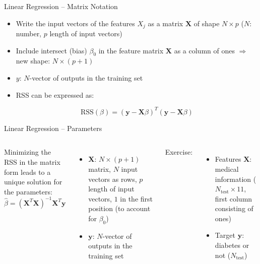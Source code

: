 \documentclass[
                en,
                ]{sdqbeamer}
\begin{document}
\begin{frame}{Linear Regression -- Matrix Notation}
    \begin{itemize}
        \setlength\itemsep{2em}
        \item Write the input vectors of the features $X_j$ as a matrix
            $\boldsymbol{X}$ of shape $N \times p$ ($N$: number, $p$ length of
            input vectors)
        \item Include intersect (bias) $\beta_0$ in the feature matrix
            $\boldsymbol{X}$ as a column of ones $\Rightarrow$ new shape: $N
            \times (p+1)$
        \item $y$: $N$-vector of outputs in the training set
        \item RSS can be expressed as:

            \begin{equation*}
                \text{RSS}(\beta) = (\boldsymbol{y} - \boldsymbol{X} \beta)^T
                (\boldsymbol{y} - \boldsymbol{X} \beta)
            \end{equation*}
    \end{itemize}
\end{frame}

\begin{frame}{Linear Regression -- Parameters}
    \begin{columns}
        \column{\kitthreecolumns}
        \begin{greenblock}{Minimizing the RSS in the matrix form leads to a
            unique solution for the parameters:}
                \begin{equation*}
                    \hat{\beta} = (\boldsymbol{X}^{T} \boldsymbol{X})^{-1}
                    \boldsymbol{X}^T \boldsymbol{y}
                \end{equation*}
    \end{greenblock}
        \begin{itemize}
            \setlength\itemsep{2em}
            \item $\boldsymbol{X}$: $N \times (p+1)$ matrix, $N$ input vectors
                as rows, $p$ length of input vectors, $1$ in the first position
                (to account for $\beta_0$) \item $\boldsymbol{y}$: $N$-vector of
                outputs in the training set
        \end{itemize}

        \column{\kitthreecolumns}
        Exercise:
        \begin{itemize}
            \setlength\itemsep{2em}
            \item Features $\boldsymbol{X}$: medical information
                ($N_\text{test} \times 11$, first column consisting of ones)
            \item Target $\boldsymbol{y}$: diabetes or not ($N_\text{test}$)
        \end{itemize}
    \end{columns}
\end{frame}
\end{document}
